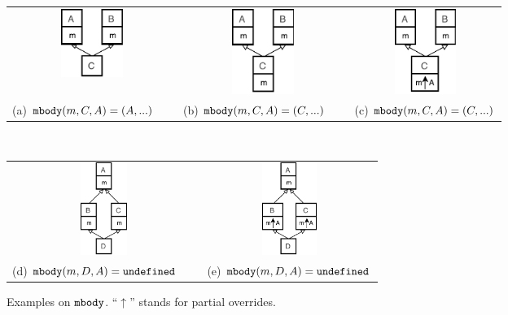 \begin{figure}[t]
	\centering
	\vspace{-1ex}
	\begin{tabular}{ccc}
		\includegraphics[width=2cm]{pics/p1.pdf}\hspace{4pt} &
		\includegraphics[width=2cm]{pics/p2.pdf}\hspace{4pt} &
		\includegraphics[width=2cm]{pics/p3.pdf}\hspace{4pt} \\
		(a) $\texttt{mbody}(m,C,A) = (A,...)$\ \ \  & (b) $\texttt{mbody}(m,C,A) = (C,...)$\ \ \  & (c) $\texttt{mbody}(m,C,A) = (C,...)$
	\end{tabular} \\
   \begin{tabular}{cc}
   	\includegraphics[height=3cm]{pics/p4.pdf}\hspace{4pt} &
   	\includegraphics[height=3cm]{pics/p5.pdf}\hspace{4pt} \\ 
   	(d) $\texttt{mbody}(m,D,A) = \texttt{undefined}$\ \ \  & (e) $\texttt{mbody}(m,D,A) = \texttt{undefined}$
   \end{tabular}
	\caption{Examples on $\texttt{mbody}$. ``$\uparrow$'' stands for partial overrides.}\label{fig:examplesmbody}
\end{figure}

